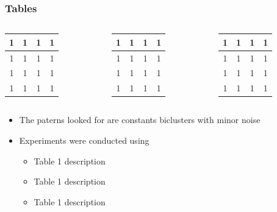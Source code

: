 \documentclass[aspectratio=169, serif ]{beamer}
\begin{document}
\begin{frame}
    \frametitle{Tables}
    \begin{columns}
        \begin{table}[h]
            \centering
            \begin{tabular}{|c|c|c|c|}
                \hline
                 1& 1 & 1 & 1  \\
                 \hline
                 1& 1 & 1 & 1  \\
                 \hline
                 1& 1 & 1 & 1  \\
                 \hline
                 1& 1 & 1 & 1  \\
                 \hline
            \end{tabular}
            \end{table}
        \begin{table}[h]
            \centering
            \begin{tabular}{|c|c|c|c|}
                \hline
                 1& 1 & 1 & 1  \\
                 \hline
                 1& 1 & 1 & 1  \\
                 \hline
                 1& 1 & 1 & 1  \\
                 \hline
                 1& 1 & 1 & 1  \\
                 \hline
            \end{tabular}
            \end{table}
        \begin{table}[h]
            \centering
            \begin{tabular}{|c|c|c|c|}
                \hline
                 1& 1 & 1 & 1  \\
                 \hline
                 1& 1 & 1 & 1  \\
                 \hline
                 1& 1 & 1 & 1  \\
                 \hline
                 1& 1 & 1 & 1  \\
                 \hline
            \end{tabular}
            \end{table}
    \end{columns}
    \begin{itemize}
        \item The paterns looked for are constants biclusters with minor noise
        \item Experiments were conducted using
        \begin{itemize}
            \item Table 1 description
            \item Table 1 description
            \item Table 1 description
        \end{itemize}
    \end{itemize}
\end{frame}
\end{document}

